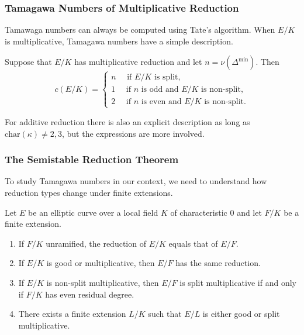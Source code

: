 \documentclass{beamer}
\theoremstyle{plain}
\begin{document}
\begin{frame}
    \frametitle{Tamagawa Numbers of Multiplicative Reduction}
    Tamawaga numbers can always be computed using Tate's algorithm. When $E/K$ is multiplicative, Tamagawa numbers have a simple description. \pause
    \begin{lemma}
        Suppose that $E/K$ has multiplicative reduction and let $n=\nu(\Delta^{\min})$. \pause Then
        \[
        c(E/K)=
        \begin{cases}
            n\quad \text{ if $E/K$ is split,}\\
            1\quad \text{ if $n$ is odd and $E/K$ is non-split,}\\
            2\quad \text{ if $n$ is even and $E/K$ is non-split.}
        \end{cases}    
        \] 
    \end{lemma}\pause

    For additive reduction there is also an explicit description as long as $\mathrm{char}(\kappa)\neq 2,3$, but the expressions are more involved.

\end{frame}

\begin{frame}
    \frametitle{The Semistable Reduction Theorem}
    To study Tamagawa numbers in our context, we need to understand how reduction types change under finite extensions.
    \begin{lemma}
        Let $E$ be an elliptic curve over a local field $K$ of characteristic $0$ and let $F/K$ be a finite extension. \pause
        \begin{enumerate}
            \item If $F/K$ unramified, the reduction of $E/K$ equals that of $E/F$.\pause
            \item If $E/K$ is good or multiplicative, then $E/F$ has the same reduction.\pause
            \item If $E/K$ is non-split multiplicative, then $E/F$ is split multiplicative if and only if $F/K$ has even residual degree. \pause
            \item There exists a finite extension $L/K$ such that $E/L$ is either good or split multiplicative.
        \end{enumerate}
    \end{lemma}    

\end{frame}
\end{document}
